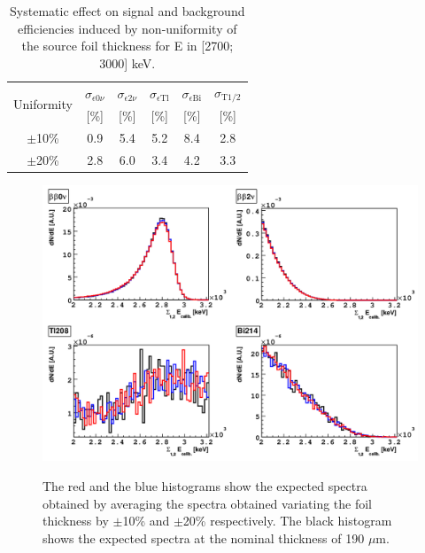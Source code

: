 \documentclass[main.tex]{subfiles}
\begin{document}
\begin{table}[h!]
\centering
\begin{tabular}{c|c|c|c|c|c}
\toprule
\multirow{2}{*}{Uniformity} & $\sigma_{\epsilon \text{0}\nu}$ & $\sigma_{\epsilon \text{2}\nu}$ & $\sigma_{\epsilon \text{Tl}}$ & $\sigma_{\epsilon \text{Bi}}$ & $\sigma_{\text{T1/2}}$ \\
  & [\%]  & [\%]  & [\%]  & [\%]  & [\%]  \\[0.1cm]
\hline 
$\pm$10\% & 0.9 & 5.4 & 5.2 & 8.4 & 2.8 \\[0.1cm]
\hline 
$\pm$20\% & 2.8 & 6.0 & 3.4 & 4.2 & 3.3 \\[0.1cm]
\bottomrule
\end{tabular}
\caption{Systematic effect on signal and background efficiencies induced by non-uniformity of the source foil thickness for E  in [2700; 3000] keV.}
\label{Tab:SystematicInfluence}
\end{table}




\begin{figure}[h!]
\centering
\includegraphics[scale=0.3]{pictures/Chap4/SpectrumThickness.png}
\label{SpectrumThickness.png}
\caption{The red and the blue histograms show the expected spectra obtained by averaging the spectra obtained variating the foil thickness by $\pm$10\% and $\pm$20\% respectively. The black histogram shows the expected
spectra at the nominal thickness of 190 $\mu$m.}
\end{figure}


\FloatBarrier
\end{document}

